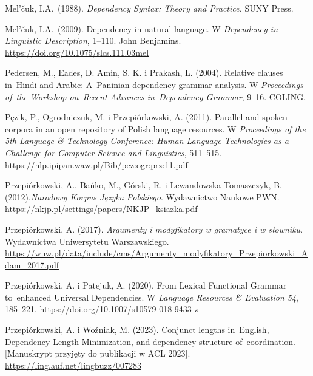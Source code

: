 \documentclass[licencjacka]{pracamgr_Kogni}
\begin{document}
\begin{thebibliography}{99}
        Mel'čuk, I.A.\ (1988). \textit{Dependency Syntax: Theory and Practice.} SUNY Press.

        Mel'čuk, I.A.\ (2009).
        Dependency in natural language.
        W \textit{Dependency in Linguistic Description}, 1--110.
        John Benjamins. \url{https://doi.org/10.1075/slcs.111.03mel}

        Pedersen, M., Eades, D. Amin, S. K. i Prakash, L. (2004).
        Relative clauses in~Hindi and Arabic: A~Paninian dependency grammar analysis.
        W \textit{Proceedings of~the Workshop on~Recent Advances in~Dependency Grammar}, 9–16.
        COLING\@.

        Pęzik, P., Ogrodniczuk, M. i Przepiórkowski, A. (2011).
        Parallel and spoken corpora in an open repository of Polish language resources.
        W \textit{Proceedings of the 5th Language \& Technology Conference: Human Language Technologies as a Challenge for Computer Science and Linguistics}, 511--515. \url{https://nlp.ipipan.waw.pl/Bib/pez:ogr:prz:11.pdf}

        Przepiórkowski, A., Bańko, M., Górski, R. i Lewandowska-Tomaszczyk, B. (2012).\textit{Narodowy Korpus Języka Polskiego}.
        Wydawnictwo Naukowe PWN. \url{https://nkjp.pl/settings/papers/NKJP_ksiazka.pdf}

        Przepiórkowski, A. (2017). \textit{Argumenty i modyfikatory w gramatyce i w słowniku}.
        Wydawnictwa Uniwersytetu Warszawskiego. \url{https://wuw.pl/data/include/cms/Argumenty_modyfikatory_Przepiorkowski_Adam_2017.pdf}

        Przepiórkowski, A. i Patejuk, A. (2020).
        From Lexical Functional Grammar to~enhanced Universal Dependencies.
        W \textit{Language Resources \& Evaluation 54}, 185–221. \url{https://doi.org/10.1007/s10579-018-9433-z}

        Przepiórkowski, A. i Woźniak, M. (2023).
        Conjunct lengths in~English, Dependency Length Minimization, and dependency structure of~coordination.
        [Manuskrypt przyjęty do publikacji w ACL 2023]. \url{https://ling.auf.net/lingbuzz/007283}


\end{thebibliography}
\end{document}
